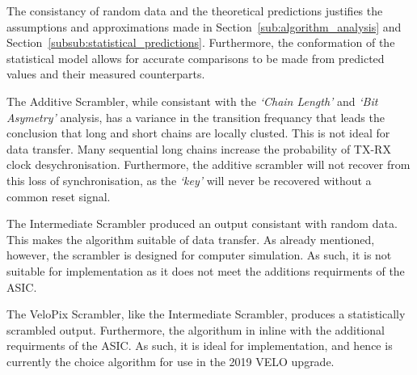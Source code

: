  		The consistancy of random data and the theoretical predictions justifies the assumptions and approximations made in Section~\ref{sub:algorithm_analysis} and Section~\ref{subsub:statistical_predictions}. 
 		Furthermore, the conformation of the statistical model allows for accurate comparisons to be made from predicted values and their measured counterparts.		
 		\par		
 		The Additive Scrambler, while consistant with the \textit{`Chain Length'} and \textit{`Bit Asymetry'} analysis, has a variance in the transition frequancy that leads the conclusion that long and short chains are locally clusted. 		
 		This is not ideal for data transfer. 		
 		Many sequential long chains increase the probability of TX-RX clock desychronisation. 		
 		Furthermore, the additive scrambler will not recover from this loss of synchronisation, as the \textit{`key'} will never be recovered without a common reset signal.		
 		\par		
 		The Intermediate Scrambler produced an output consistant with random data. 		
 		This makes the algorithm suitable of data transfer.		
 		As already mentioned, however, the scrambler is designed for computer simulation.		
 		As such, it is not suitable for implementation as it does not meet the additions requirments of the ASIC.		
 		\par		
 		The VeloPix Scrambler, like the Intermediate Scrambler, produces a statistically scrambled output.		
 		Furthermore, the algorithum in inline with the additional requirments of the ASIC.		
 		As such, it is ideal for implementation, and hence is currently the choice algorithm for use in the 2019 VELO upgrade.








